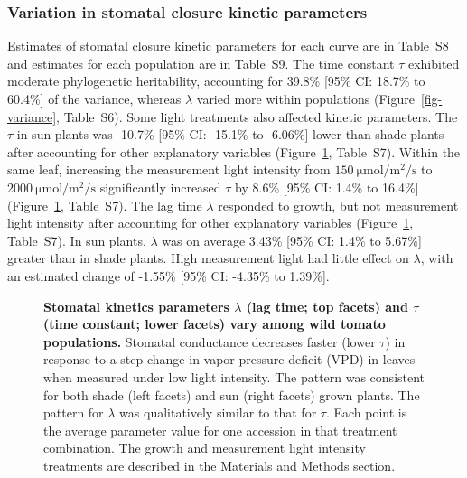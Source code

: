 \documentclass[
  letterpaper,
  DIV=11,
  numbers=noendperiod]{scrartcl}
\newcommand{\ppfdqty}[1]{$\SI{#1}{\micro\mole\per\meter\squared\per\second}$}
\begin{document}
\subsubsection{Variation in stomatal closure kinetic
parameters}\label{variation-in-stomatal-closure-kinetic-parameters}

Estimates of stomatal closure kinetic parameters for each curve are in
Table~S8 and estimates for each population are in
Table~S9. The time constant \(\tau\)
exhibited moderate phylogenetic heritability, accounting for 39.8\%
{[}95\% CI: 18.7\% to 60.4\%{]} of the variance, whereas \(\lambda\)
varied more within populations
(Figure~\ref{fig-variance}, Table~S6). Some light
treatments also affected kinetic parameters. The \(\tau\) in sun plants
was -10.7\% {[}95\% CI: -15.1\% to -6.06\%{]} lower than shade plants
after accounting for other explanatory variables
(Figure~\ref{fig-accession-kinetics}, Table~S7). Within the
same leaf, increasing the measurement light intensity from \ppfdqty{150}
to \ppfdqty{2000} significantly increased \(\tau\) by 8.6\% {[}95\% CI:
1.4\% to 16.4\%{]}
(Figure~\ref{fig-accession-kinetics}, Table~S7). The lag
time \(\lambda\) responded to growth, but not measurement light
intensity after accounting for other explanatory variables
(Figure~\ref{fig-accession-kinetics}, Table~S7). In sun
plants, \(\lambda\) was on average 3.43\% {[}95\% CI: 1.4\% to 5.67\%{]}
greater than in shade plants. High measurement light had little effect
on \(\lambda\), with an estimated change of -1.55\% {[}95\% CI: -4.35\%
to 1.39\%{]}.

\begin{figure}


\caption{\label{fig-accession-kinetics}\textbf{Stomatal kinetics parameters $\lambda$ (lag time; top facets) and $\tau$ (time constant; lower facets) vary among wild tomato populations.}
Stomatal conductance decreases faster (lower \(\tau\)) in response to a
step change in vapor pressure deficit (VPD) in leaves when measured
under low light intensity. The pattern was consistent for both shade
(left facets) and sun (right facets) grown plants. The pattern for
\(\lambda\) was qualitatively similar to that for \(\tau\). Each point
is the average parameter value for one accession in that treatment
combination. The growth and measurement light intensity treatments are
described in the Materials and Methods section.}

\end{figure}%
\end{document}
